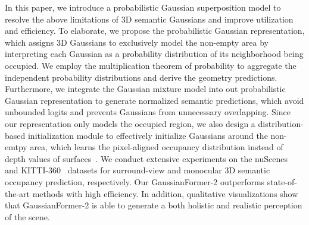 In this paper, we introduce a probabilistic Gaussian superposition model to resolve the above limitations of 3D semantic Gaussians and improve utilization and efficiency. 
To elaborate, we propose the probabilistic Gaussian representation, which assigns 3D Gaussians to exclusively model the non-empty area by interpreting each Gaussian as a probability distribution of its neighborhood being occupied.
We employ the multiplication theorem of probability to aggregate the independent probability distributions and derive the geometry predictions.
Furthermore, we integrate the Gaussian mixture model into out probabilistic Gaussian representation to generate normalized semantic predictions, which avoid unbounded logits and prevents Gaussians from unnecessary overlapping.
Since our representation only models the occupied region, we also design a distribution-based initialization module to effectively initialize Gaussians around the non-emtpy area, which learns the pixel-aligned occupancy distribution instead of depth values of surfaces~\cite{li2023voxformer,li2022bevdepth,huang2021bevdet}.
We conduct extensive experiments on the nuScenes~\cite{caesar2020nuscenes} and KITTI-360~\cite{Liao2022kitti360} datasets for surround-view and monocular 3D semantic occupancy prediction, respectively. 
Our GaussianFormer-2 outperforms state-of-the-art methods
with high efficiency. 
In addition, qualitative visualizations show that GaussianFormer-2 is able to generate a both holistic and realistic perception of the scene.

